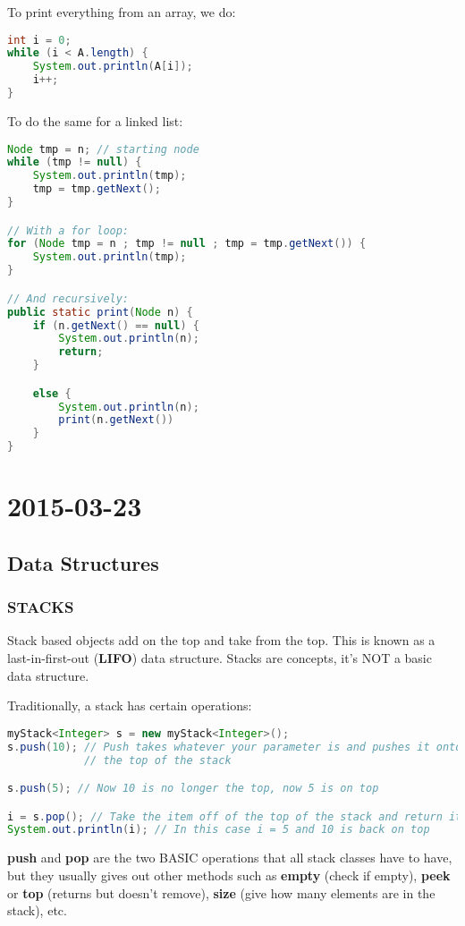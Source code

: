 \documentclass [12 pt, twoside] {article}
\begin{document}
To print everything from an array, we do:
\begin{lstlisting}[language=java]
int i = 0;
while (i < A.length) {
    System.out.println(A[i]);
    i++;
}
\end{lstlisting}

To do the same for a linked list:
\begin{lstlisting}[language=java]
Node tmp = n; // starting node
while (tmp != null) {
    System.out.println(tmp);
    tmp = tmp.getNext();
}

// With a for loop:
for (Node tmp = n ; tmp != null ; tmp = tmp.getNext()) {
    System.out.println(tmp);
}

// And recursively:
public static print(Node n) {
    if (n.getNext() == null) {
        System.out.println(n);
        return;
    }

    else {
        System.out.println(n);
        print(n.getNext())
    }
}
\end{lstlisting}

\section{2015-03-23}
\subsection{Data Structures}
\subsubsection{STACKS}
Stack based objects add on the top and take from the top. This is known as a
last-in-first-out (\textbf{LIFO}) data structure. Stacks are concepts, it's NOT a basic
data structure.

Traditionally, a stack has certain operations:
\begin{lstlisting}[language=java]
myStack<Integer> s = new myStack<Integer>();
s.push(10); // Push takes whatever your parameter is and pushes it onto 
            // the top of the stack

s.push(5); // Now 10 is no longer the top, now 5 is on top

i = s.pop(); // Take the item off of the top of the stack and return it.
System.out.println(i); // In this case i = 5 and 10 is back on top
\end{lstlisting}

\textbf{push} and \textbf{pop} are the two BASIC operations that all stack classes have to have,
but they usually gives out other methods such as \textbf{empty} (check if empty), \textbf{peek}
or \textbf{top} (returns but doesn't remove),  \textbf{size} (give how many
elements are in the stack), etc.
\end{document}

